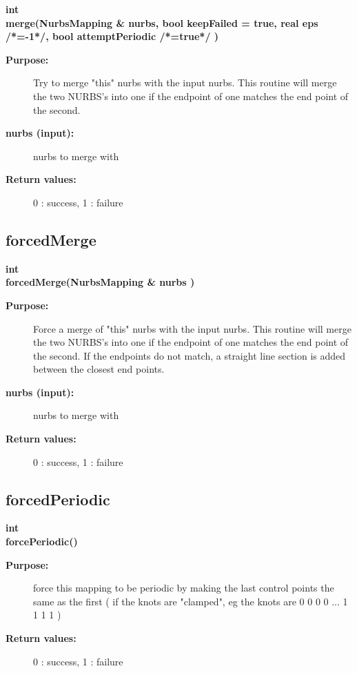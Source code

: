 \begin{flushleft} \textbf{%
int  \\ 
\settowidth{\NurbsMappingIncludeArgIndent}{merge(}%
merge(NurbsMapping \& nurbs, bool keepFailed  = true, real eps /*=-1*/, bool attemptPeriodic /*=true*/ )
}\end{flushleft}
\begin{description}
\item[{\bf Purpose:}]  Try to merge "this" nurbs with the input nurbs. This routine will merge
  the two NURBS's into one if the endpoint of one matches the end point of the second.
\item[{\bf nurbs (input):}]  nurbs to merge with
\item[{\bf Return values:}]  0 : success, 1 : failure
\end{description}
\subsection{forcedMerge}
 
\begin{flushleft} \textbf{%
int  \\ 
\settowidth{\NurbsMappingIncludeArgIndent}{forcedMerge(}%
forcedMerge(NurbsMapping \& nurbs  )
}\end{flushleft}
\begin{description}
\item[{\bf Purpose:}]  Force a merge of "this" nurbs with the input nurbs. This routine will merge
  the two NURBS's into one if the endpoint of one matches the end point of the second. If
  the endpoints do not match, a straight line section is added between the closest end
  points.
\item[{\bf nurbs (input):}]  nurbs to merge with
\item[{\bf Return values:}]  0 : success, 1 : failure
\end{description}
\subsection{forcedPeriodic}
 
\begin{flushleft} \textbf{%
int  \\ 
\settowidth{\NurbsMappingIncludeArgIndent}{forcePeriodic(}%
forcePeriodic()
}\end{flushleft}
\begin{description}
\item[{\bf Purpose:}]  force this mapping to be periodic by making the last control points the
 same as the first ( if the knots are "clamped", eg the knots are 0 0 0 0 ... 1 1 1 1 )
\item[{\bf Return values:}]  0 : success, 1 : failure
\end{description}
